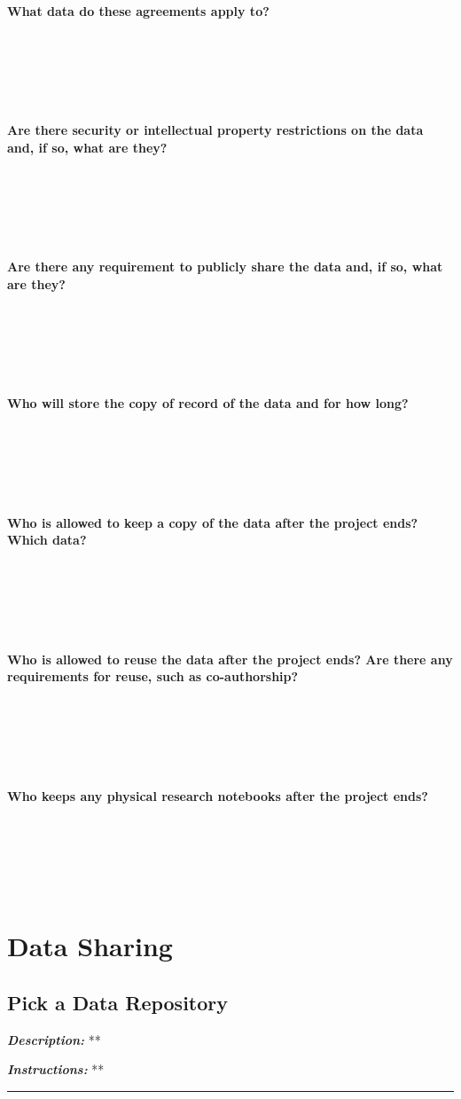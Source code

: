 \documentclass[
]{book}
\begin{document}
\textbf{What data do these agreements apply to?}

~

~

~

\textbf{Are there security or intellectual property restrictions on the data and, if so, what are they?}

~

~

~

\textbf{Are there any requirement to publicly share the data and, if so, what are they?}

~

~

~

\textbf{Who will store the copy of record of the data and for how long?}

~

~

~

\textbf{Who is allowed to keep a copy of the data after the project ends? Which data?}

~

~

~

\textbf{Who is allowed to reuse the data after the project ends? Are there any requirements for reuse, such as co-authorship?}

~

~

~

\textbf{Who keeps any physical research notebooks after the project ends?}

~

~

~

\hypertarget{data-sharing}{%
\chapter{Data Sharing}\label{data-sharing}}

\hypertarget{data-repository}{%
\section{Pick a Data Repository}\label{data-repository}}

\textbf{\emph{Description:}} **

\textbf{\emph{Instructions:}} **

\begin{center}\rule{0.5\linewidth}{0.5pt}\end{center}
\end{document}
